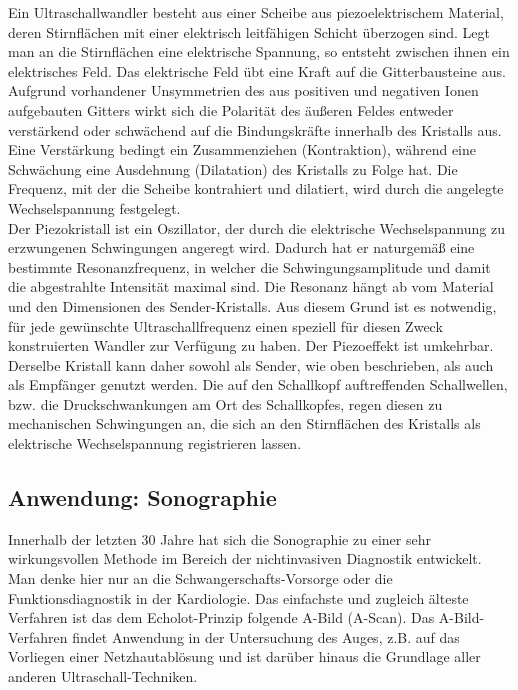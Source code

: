 \noindent
Ein Ultraschallwandler besteht aus einer Scheibe aus piezoelektrischem Material, deren Stirnflächen mit einer elektrisch leitfähigen Schicht überzogen sind. Legt man an die Stirnflächen eine elektrische Spannung, so entsteht zwischen ihnen ein elektrisches Feld. Das elektrische Feld übt eine Kraft auf die Gitterbausteine aus. Aufgrund vorhandener Unsymmetrien des aus positiven und negativen Ionen aufgebauten Gitters wirkt sich die Polarität des äußeren Feldes entweder verstärkend oder schwächend auf die Bindungskräfte innerhalb des Kristalls aus. Eine Verstärkung bedingt ein Zusammenziehen (Kontraktion), während eine Schwächung eine Ausdehnung (Dilatation) des Kristalls zu Folge hat. Die Frequenz, mit der die Scheibe kontrahiert und dilatiert, wird durch die angelegte Wechselspannung festgelegt.\\

\noindent
Der Piezokristall ist ein Oszillator, der durch die elektrische Wechselspannung zu erzwungenen Schwingungen angeregt wird. Dadurch hat er naturgemäß eine bestimmte Resonanzfrequenz, in welcher die Schwingungsamplitude und damit die abgestrahlte Intensität maximal sind. Die Resonanz hängt ab vom Material und den Dimensionen des Sender-Kristalls. Aus diesem Grund ist es notwendig, für jede gewünschte Ultraschallfrequenz einen speziell für diesen Zweck konstruierten Wandler zur Verfügung zu haben. Der Piezoeffekt ist umkehrbar. Derselbe Kristall kann daher sowohl als Sender, wie oben beschrieben, als auch als Empfänger genutzt werden. Die auf den Schallkopf auftreffenden Schallwellen, bzw. die Druckschwankungen am Ort des Schallkopfes, regen diesen zu mechanischen Schwingungen an, die sich an den Stirnflächen des Kristalls als elektrische Wechselspannung registrieren lassen.

\subsection{Anwendung: Sonographie}

Innerhalb der letzten 30 Jahre hat sich die Sonographie zu einer sehr wirkungsvollen Methode im Bereich der nichtinvasiven Diagnostik entwickelt. Man denke hier nur an die Schwangerschafts-Vorsorge oder die Funktionsdiagnostik in der Kardiologie. Das einfachste und zugleich älteste Verfahren ist das dem Echolot-Prinzip folgende A-Bild (A-Scan). Das A-Bild-Verfahren findet Anwendung in der Untersuchung des Auges, z.B. auf das Vorliegen einer Netzhautablösung und ist darüber hinaus die Grundlage aller anderen Ultraschall-Techniken.\\

